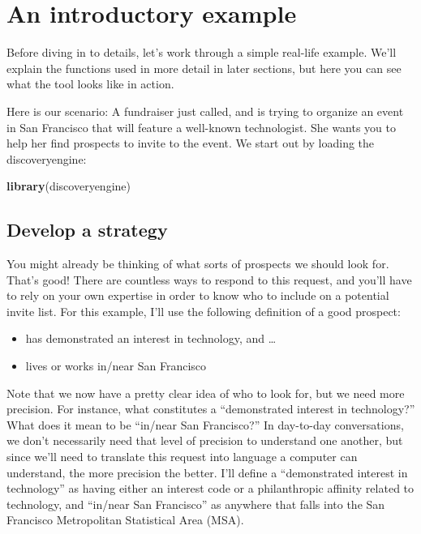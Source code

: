 \documentclass[]{book}
\newenvironment{Shaded}{\begin{snugshade}}{\end{snugshade}}
\newcommand{\KeywordTok}[1]{\textcolor[rgb]{0.13,0.29,0.53}{\textbf{#1}}}
\newcommand{\NormalTok}[1]{#1}
\providecommand{\tightlist}{%
  \setlength{\itemsep}{0pt}\setlength{\parskip}{0pt}}
\begin{document}
\hypertarget{intro-example}{%
\chapter{An introductory example}\label{intro-example}}

Before diving in to details, let's work through a simple real-life example. We'll explain the functions used in more detail in later sections, but here you can see what the tool looks like in action.

Here is our scenario: A fundraiser just called, and is trying to organize an event in San Francisco that will feature a well-known technologist. She wants you to help her find prospects to invite to the event. We start out by loading the discoveryengine:

\begin{Shaded}
\begin{Highlighting}[]
\KeywordTok{library}\NormalTok{(discoveryengine)}
\end{Highlighting}
\end{Shaded}

\hypertarget{develop-a-strategy}{%
\section{Develop a strategy}\label{develop-a-strategy}}

You might already be thinking of what sorts of prospects we should look for. That's good! There are countless ways to respond to this request, and you'll have to rely on your own expertise in order to know who to include on a potential invite list. For this example, I'll use the following definition of a good prospect:

\begin{itemize}
\tightlist
\item
  has demonstrated an interest in technology, and \ldots{}
\item
  lives or works in/near San Francisco
\end{itemize}

Note that we now have a pretty clear idea of who to look for, but we need more precision. For instance, what constitutes a ``demonstrated interest in technology?'' What does it mean to be ``in/near San Francisco?'' In day-to-day conversations, we don't necessarily need that level of precision to understand one another, but since we'll need to translate this request into language a computer can understand, the more precision the better. I'll define a ``demonstrated interest in technology'' as having either an interest code or a philanthropic affinity related to technology, and ``in/near San Francisco'' as anywhere that falls into the San Francisco Metropolitan Statistical Area (MSA).
\end{document}
